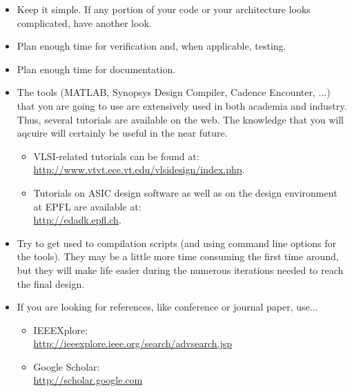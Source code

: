 \documentclass[12pt,english]{TCLsem}
\begin{document}
\begin{itemize}

\item Keep it simple. If any portion of your code or your architecture looks complicated, have another look.  

\item Plan enough time for verification and, when applicable, testing.

\item Plan enough time for documentation.

\item The tools (MATLAB, Synopsys Design Compiler, Cadence Encounter, ...) that you are going to use are extensively used in both academia and industry. Thus, several tutorials are available on the web. The knowledge that you will aqcuire will certainly be useful in the near future.
  \begin{itemize}
    \item VLSI-related tutorials can be found at:\\ \url{http://www.vtvt.ece.vt.edu/vlsidesign/index.php}.
    \item Tutorials on ASIC design software as well as on the design environment at EPFL are available at:\\ \url{http://edadk.epfl.ch}.
  \end{itemize}

\item Try to get used to compilation scripts (and using command line options for the tools). 
  They may be a little more time consuming the first time around, but they will make life easier during the 
  numerous iterations needed to reach the final design.
  
\item If you are looking for references, like conference or journal 
  paper, use...
  \begin{itemize}
  \item IEEEXplore:\\\url{http://ieeexplore.ieee.org/search/advsearch.jsp} 
  \item Google Scholar:\\ \url{http://scholar.google.com}
  \end{itemize}

\end{itemize}

% 
%
\end{document}
